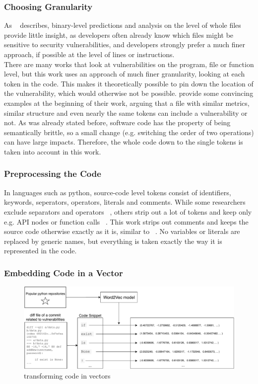 \documentclass[
	a4paper,
	pagesize,
	pdftex,
	12pt,
	twoside, %
	BCOR=5mm, %
	ngerman,
	fleqn,
	final,
	]{scrartcl}
\begin{document}
\subsubsection{Choosing Granularity}
As  ~\cite{Morrison.2015} describes, binary-level predictions and analysis on the level of whole files provide little insight, as developers often already know which files might be sensitive to security vulnerabilities, and developers strongly prefer a much finer approach, if possible at the level of lines or instructions.\\
There are many works that look at vulnerabilities on the program, file or function level, but this work uses an approach of much finer granularity, looking at each token in the code. This makes it theoretically possible to pin down the location of the vulnerability, which would otherwise not be possible. \cite{Dam.2017} provide some convincing examples at the beginning of their work, arguing that a file with similar metrics, similar structure and even nearly the same tokens can include a vulnerability or not. As was already stated before, software code has the property of being semantically brittle, so a small change (e.g. switching the order of two operations) can have large impacts. Therefore, the whole code down to the single tokens is taken into account in this work.

\subsubsection{Preprocessing the Code}
In languages such as python, source-code level tokens consist of identifiers, keywords, seperators, operators, literals and comments. While some researchers exclude separators and operators ~\cite{Pang.2015}, others strip out a lot of tokens and keep only e.g. API nodes or function calls ~\cite{Yamaguchi.2012}. This work strips out comments and keeps the source code otherwise exactly as it is, similar to  ~\cite{Hovsepyan.2012}. No variables or literals are replaced by generic names, but everything is taken  exactly the way it is represented in the code. 

\subsubsection{Embedding Code in a Vector}
\begin{figure}[ht]
	\centering
	\includegraphics[width=\linewidth]{img/Word2Vec}
	\caption{transforming code in vectors}
	\label{fig:word2vec}
\end{figure}
\end{document}

